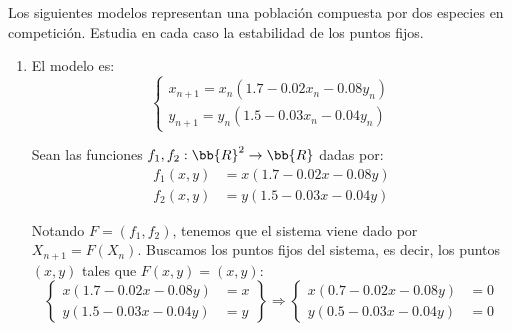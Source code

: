 \begin{ejercicio}
Los siguientes modelos representan una población compuesta por dos especies en competición. Estudia en cada caso la estabilidad de los puntos fijos.
\begin{enumerate}
    \item El modelo es:
    \begin{equation*}
        \begin{cases}
            x_{n+1} = x_n(1.7 - 0.02x_n - 0.08y_n)\\
            y_{n+1} = y_n(1.5 - 0.03x_n - 0.04y_n)
        \end{cases}
    \end{equation*}

    Sean las funciones $f_1, f_2:\bb{R}^2\to\bb{R}$ dadas por:
    \begin{align*}
        f_1(x,y) &= x(1.7 - 0.02x - 0.08y)\\
        f_2(x,y) &= y(1.5 - 0.03x - 0.04y)
    \end{align*}

    Notando $F=(f_1,f_2)$, tenemos que el sistema viene dado por $X_{n+1} = F(X_n)$.
    Buscamos los puntos fijos del sistema, es decir, los puntos $(x,y)$ tales que $F(x,y) = (x,y)$:
    \begin{equation*}
        \left\{
            \begin{array}{lr}
                x(1.7 - 0.02x - 0.08y) &= x\\
                y(1.5 - 0.03x - 0.04y) &= y
            \end{array}
        \right\}
        \Longrightarrow
        \left\{
            \begin{array}{lr}
                x(0.7 - 0.02x - 0.08y) &=0\\
                y(0.5 - 0.03x - 0.04y) &=0
            \end{array}
        \right.
    \end{equation*}


\end{enumerate}
\end{ejercicio}
